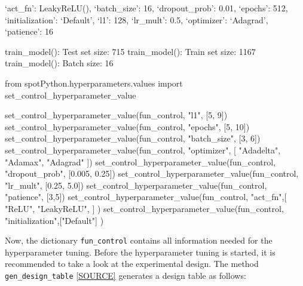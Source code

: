\documentclass[
  letterpaper,
  DIV=11,
  numbers=noendperiod]{scrreprt}
\newenvironment{Shaded}{\begin{snugshade}}{\end{snugshade}}
\newcommand{\DecValTok}[1]{\textcolor[rgb]{0.68,0.00,0.00}{#1}}
\newcommand{\FloatTok}[1]{\textcolor[rgb]{0.68,0.00,0.00}{#1}}
\newcommand{\ImportTok}[1]{\textcolor[rgb]{0.00,0.46,0.62}{#1}}
\newcommand{\NormalTok}[1]{\textcolor[rgb]{0.00,0.23,0.31}{#1}}
\newcommand{\StringTok}[1]{\textcolor[rgb]{0.13,0.47,0.30}{#1}}
\begin{document}
`act\_fn': LeakyReLU(), `batch\_size': 16, `dropout\_prob': 0.01,
`epochs': 512, `initialization': `Default', `l1': 128, `lr\_mult': 0.5,
`optimizer': `Adagrad', `patience': 16

train\_model(): Test set size: 715 train\_model(): Train set size: 1167
train\_model(): Batch size: 16

\begin{Shaded}
\begin{Highlighting}[]
\ImportTok{from}\NormalTok{ spotPython.hyperparameters.values }\ImportTok{import}\NormalTok{ set\_control\_hyperparameter\_value}

\NormalTok{set\_control\_hyperparameter\_value(fun\_control, }\StringTok{"l1"}\NormalTok{, [}\DecValTok{5}\NormalTok{, }\DecValTok{9}\NormalTok{])}
\NormalTok{set\_control\_hyperparameter\_value(fun\_control, }\StringTok{"epochs"}\NormalTok{, [}\DecValTok{5}\NormalTok{, }\DecValTok{10}\NormalTok{])}
\NormalTok{set\_control\_hyperparameter\_value(fun\_control, }\StringTok{"batch\_size"}\NormalTok{, [}\DecValTok{3}\NormalTok{, }\DecValTok{6}\NormalTok{])}
\NormalTok{set\_control\_hyperparameter\_value(fun\_control, }\StringTok{"optimizer"}\NormalTok{, [}
                \StringTok{"Adadelta"}\NormalTok{,}
                \StringTok{"Adamax"}\NormalTok{,}
                \StringTok{"Adagrad"}                
\NormalTok{            ])}
\NormalTok{set\_control\_hyperparameter\_value(fun\_control, }\StringTok{"dropout\_prob"}\NormalTok{, [}\FloatTok{0.005}\NormalTok{, }\FloatTok{0.25}\NormalTok{])}
\NormalTok{set\_control\_hyperparameter\_value(fun\_control, }\StringTok{"lr\_mult"}\NormalTok{, [}\FloatTok{0.25}\NormalTok{, }\FloatTok{5.0}\NormalTok{])}
\NormalTok{set\_control\_hyperparameter\_value(fun\_control, }\StringTok{"patience"}\NormalTok{, [}\DecValTok{3}\NormalTok{,}\DecValTok{5}\NormalTok{])}
\NormalTok{set\_control\_hyperparameter\_value(fun\_control, }\StringTok{"act\_fn"}\NormalTok{,[}
                \StringTok{"ReLU"}\NormalTok{,}
                \StringTok{"LeakyReLU"}\NormalTok{,}
\NormalTok{            ] )}
\NormalTok{set\_control\_hyperparameter\_value(fun\_control, }\StringTok{"initialization"}\NormalTok{,[}\StringTok{"Default"}\NormalTok{] )}
\end{Highlighting}
\end{Shaded}

Now, the dictionary \texttt{fun\_control} contains all information
needed for the hyperparameter tuning. Before the hyperparameter tuning
is started, it is recommended to take a look at the experimental design.
The method \texttt{gen\_design\_table}
\href{https://github.com/sequential-parameter-optimization/spotPython/blob/main/src/spotPython/utils/eda.py}{{[}SOURCE{]}}
generates a design table as follows:
\end{document}
